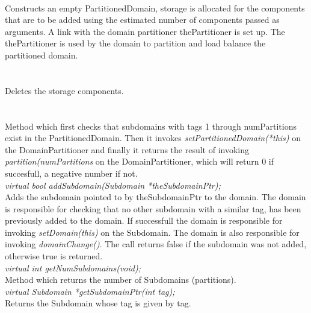  \\ 
Constructs an empty PartitionedDomain, storage is allocated for the components
that are to be added using the estimated number of components passed
as arguments. A link with the domain partitioner \p thePartitioner
is set up. The \p thePartitioner is used by the domain to partition
and load balance the partitioned domain. \\


  \\
  \\
Deletes the storage components. \\

  \\
\\
Method which first checks that subdomains with tags 1 through \p numPartitions exist in the 
PartitionedDomain. Then it invokes {\em setPartitionedDomain(*this)} on the DomainPartitioner
and finally it returns the result of invoking {\em partition(numPartitions} on
the DomainPartitioner, which will return 0 if succesfull, a negative number if not. \\

{\em virtual bool addSubdomain(Subdomain *theSubdomainPtr);}  \\
Adds the subdomain pointed to by theSubdomainPtr to the domain. The domain
is responsible for checking that no other subdomain with a similar tag,
has been previously added to the domain. If successfull
the domain is responsible for invoking {\em setDomain(this)} on the
Subdomain. The domain is also responsible for invoking {\em
domainChange()}. The call returns \p false if the subdomain was not added, 
otherwise \p true is returned. \\  

{\em virtual int getNumSubdomains(void);}\\
Method which returns the number of Subdomains (partitions). \\

{\em virtual Subdomain *getSubdomainPtr(int tag);}\\
Returns the Subdomain whose tag is given by \p tag. \\

